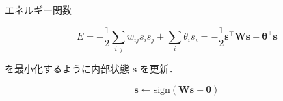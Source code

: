 エネルギー関数

$$
E=-{\frac 12}\sum _{{i,j}}{w_{{ij}}{s_{i}}{s_{j}}}+\sum _{i}{\theta _{i}}{s_{i}}=-{\frac 12}\mathbf{s}^\top\mathbf{W}\mathbf{s}+\mathbf{\theta}^\top\mathbf{s}
$$

を最小化するように内部状態 $\mathbf{s}$ を更新．

$$
\mathbf{s}\leftarrow \text{sign}\left(\mathbf{W}\mathbf{s}-\mathbf{\theta}\right)
$$
